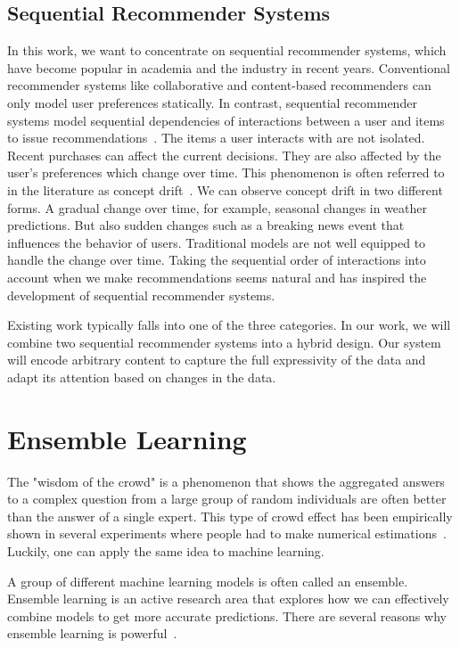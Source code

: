 \subsection{Sequential Recommender Systems}
In this work, we want to concentrate on sequential recommender systems, which have become popular in academia and the industry in recent years. Conventional recommender systems like collaborative and content-based recommenders can only model user preferences statically. In contrast, sequential recommender systems model sequential dependencies of interactions between a user and items to issue recommendations~\cite{wang2019survey, wang2019sequential}. The items a user interacts with are not isolated. Recent purchases can affect the current decisions. They are also affected by the user's preferences which change over time. This phenomenon is often referred to in the literature as concept drift~\cite{tsymbal2004problem}. We can observe concept drift in two different forms. A gradual change over time, for example, seasonal changes in weather predictions. But also sudden changes such as a breaking news event that influences the behavior of users. Traditional models are not well equipped to handle the change over time. Taking the sequential order of interactions into account when we make recommendations seems natural and has inspired the development of sequential recommender systems.

Existing work typically falls into one of the three categories.
In our work, we will combine two sequential recommender systems into a hybrid design. Our system will encode arbitrary content to capture the full expressivity of the data and adapt its attention based on changes in the data.


\section{Ensemble Learning}
\label{sec:ensemble_learning}

The "wisdom of the crowd" is a phenomenon that shows the aggregated answers to a complex question from a large group of random individuals are often better than the answer of a single expert. This type of crowd effect has been empirically shown in several experiments where people had to make numerical estimations~\cite{yi2012wisdom}. Luckily, one can apply the same idea to machine learning.

A group of different machine learning models is often called an ensemble. Ensemble learning is an active research area that explores how we can effectively combine models to get more accurate predictions. There are several reasons why ensemble learning is powerful~\cite{dietterich2000ensemble}.

